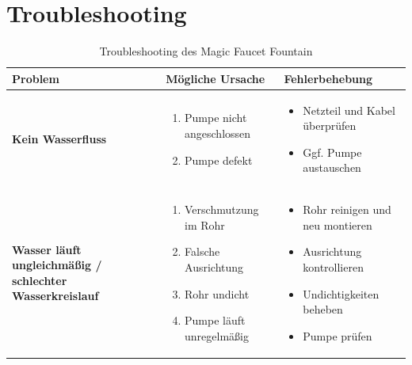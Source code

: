 %
%
%

\chapter{Troubleshooting}
\begin{table}[h]
	\centering
	\caption{Troubleshooting des Magic Faucet Fountain}
	\renewcommand{\arraystretch}{1.4}
	\begin{tabular}{|>{\centering\arraybackslash}m{4.5cm}|
			>{\centering\arraybackslash}m{5.2cm}|
			>{\centering\arraybackslash}m{5cm}|}
		\hline
		\textbf{Problem} & \textbf{Mögliche Ursache} & \textbf{Fehlerbehebung} \\
		\hline
		\textbf{Kein Wasserfluss} 
		& \begin{enumerate}[nosep,leftmargin=*]
			\item Pumpe nicht angeschlossen
			\item Pumpe defekt
		\end{enumerate}
		& \begin{itemize}[nosep,leftmargin=*]
			\item Netzteil und Kabel überprüfen
			\item Ggf. Pumpe austauschen
		\end{itemize} \\
		\hline
		\textbf{Wasser läuft ungleichmäßig / schlechter Wasserkreislauf} 
		& \begin{enumerate}[nosep,leftmargin=*]
			\item Verschmutzung im Rohr
			\item Falsche Ausrichtung
			\item Rohr undicht
			\item Pumpe läuft unregelmäßig
		\end{enumerate}
		& \begin{itemize}[nosep,leftmargin=*]
			\item Rohr reinigen und neu montieren
			\item Ausrichtung kontrollieren
			\item Undichtigkeiten beheben
			\item Pumpe prüfen

\end{itemize}
\end{tabular}
\end{table}
